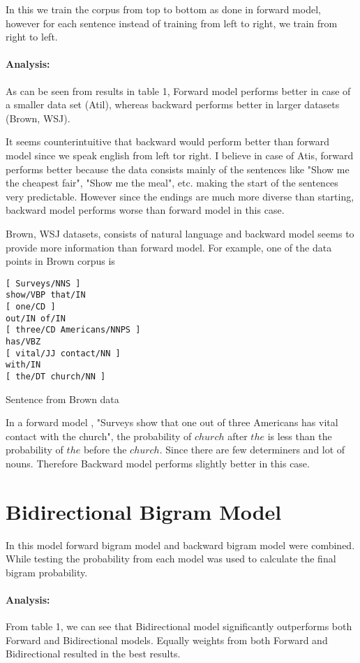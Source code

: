 \documentclass[10pt] {article}
\begin{document}
In this we train the corpus from top to bottom as done in forward model, however for each sentence instead of training from left to right, we train from right to left. 

\paragraph{Analysis:} As can be seen from results in table 1, Forward model performs better in case of a smaller data set (Atil), whereas backward performs better in larger datasets (Brown, WSJ). 

It seems counterintuitive that backward would perform better than forward model since we speak english from left tor right. I believe in case of Atis, forward performs better because the data consists mainly of the sentences like "Show me the cheapest fair", "Show me the meal", etc. making the start of the sentences very predictable. However since the endings are much more diverse than starting, backward model performs worse than forward model in this case.

Brown, WSJ datasets, consists of natural language and backward model seems to provide more information than forward model. For example, one of the data points in Brown corpus is 

\begin{listing}[ht!]
\begin{verbatim}
[ Surveys/NNS ]
show/VBP that/IN
[ one/CD ]
out/IN of/IN
[ three/CD Americans/NNPS ]
has/VBZ
[ vital/JJ contact/NN ]
with/IN
[ the/DT church/NN ]
\end{verbatim}
\label{lst:sched}
\caption{Sentence from Brown data}
\end{listing}

In a forward model , "Surveys show that one out of three Americans has vital contact with the church", the probability of  $church$ after $the$ is less than the probability of $the$ before the $church$. Since there are few determiners and lot of nouns. Therefore Backward model performs slightly better in this case. 

\section{Bidirectional Bigram Model}
In this model forward bigram model and backward bigram model were combined. While testing the probability from each model was used to calculate the final bigram probability.  

\paragraph{Analysis:} From table 1, we can see that Bidirectional model significantly outperforms both Forward and Bidirectional models. Equally weights from both Forward and Bidirectional resulted in the best results. 
\end{document}
